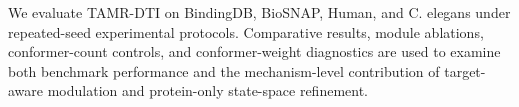 We evaluate TAMR-DTI on BindingDB, BioSNAP, Human, and C. elegans under repeated-seed experimental
protocols. Comparative results, module ablations, conformer-count controls, and conformer-weight diagnostics
are used to examine both benchmark performance and the mechanism-level contribution of target-aware
modulation and protein-only state-space refinement.
